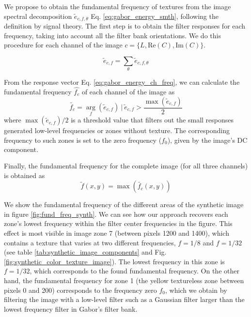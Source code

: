 \documentclass[journal]{IEEEtran}
\newcommand{\RE}{\mathrm{Re}}
\newcommand{\IM}{\mathrm{Im}}
\begin{document}
We propose to obtain the fundamental frequency of textures from the image spectral decomposition $\widetilde{e}_{c, f, \theta}$ Eq. \eqref{eq:gabor_energy_smth}, following the definition by signal theory. The first step is to obtain the filter responses for each frequency, taking into account all the filter bank orientations. We do this procedure for each channel of the image $c=\{L, \RE(C), \IM(C)\}$.

\begin{equation}
	\widetilde{e}_{c, f} =  \underset{\theta }{\sum} \widetilde{e}_{c, f, \theta}  \label{eq:gabor_energy_ch_freq}
\end{equation}

From the response vector Eq. \eqref{eq:gabor_energy_ch_freq}, we can calculate the fundamental frequency $\widehat{f_c}$ of each channel of the image as
\begin{equation}
	\widetilde{f_c} =  \underset{f}{\arg} (\widetilde{e}_{c, f}) ~|~ \widetilde{e}_{c, f} > \frac{\max(\widetilde{e}_{c, f})}{2} \label{eq:fundamental_frequencygabor_ch}
\end{equation}
where $\max(\widetilde{e}_{c, f})/2$ is a threshold value that filters out the small responses generated low-level frequencies or zones without texture. The corresponding frequency to such zones is set to the zero frequency ($f_0$), given by the image's DC component.

Finally, the fundamental frequency for the complete image (for all three channels) is obtained as
\begin{equation}
	\widetilde{f}(x,y) =  \max(\widetilde{f_c}(x,y))  \label{eq:fundamental_freq}
\end{equation}

We show the fundamental frequency of the different areas of the synthetic image in figure \ref{fig:fund_freq_synth}. We can see how our approach recovers each zone's lowest frequency within the filter center frequencies in the figure. This effect is most visible in image zone 7 (between pixels 1200 and 1400), which contains a texture that varies at two different frequencies, $f = 1/8$ and $f = 1/32$ (see table \ref{tab:synthetic_image_components} and Fig. \ref{fig:synthetic_color_texture_image}). The lowest frequency in this zone is $f = 1/32$, which corresponds to the found fundamental frequency. On the other hand, the fundamental frequency for zone 1 (the yellow textureless zone between pixels 0 and 200) corresponds to the frequency zero $f_0$, which we obtain by filtering the image with a low-level filter such as a Gaussian filter larger than the lowest frequency filter in Gabor's filter bank.
\end{document}
